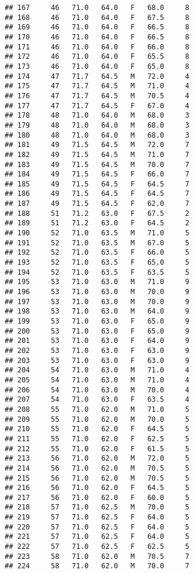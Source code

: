 \documentclass[
]{article}
\begin{document}
\begin{verbatim}
## 167     46   71.0   64.0   F   68.0     8
## 168     46   71.0   64.0   F   67.5     8
## 169     46   71.0   64.0   F   66.5     8
## 170     46   71.0   64.0   F   66.5     8
## 171     46   71.0   64.0   F   66.0     8
## 172     46   71.0   64.0   F   65.5     8
## 173     46   71.0   64.0   F   65.0     8
## 174     47   71.7   64.5   M   72.0     4
## 175     47   71.7   64.5   M   71.0     4
## 176     47   71.7   64.5   M   70.5     4
## 177     47   71.7   64.5   F   67.0     4
## 178     48   71.0   64.0   M   68.0     3
## 179     48   71.0   64.0   M   68.0     3
## 180     48   71.0   64.0   M   68.0     3
## 181     49   71.5   64.5   M   72.0     7
## 182     49   71.5   64.5   M   71.0     7
## 183     49   71.5   64.5   M   70.0     7
## 184     49   71.5   64.5   F   66.0     7
## 185     49   71.5   64.5   F   64.5     7
## 186     49   71.5   64.5   F   64.5     7
## 187     49   71.5   64.5   F   62.0     7
## 188     51   71.2   63.0   F   67.5     2
## 189     51   71.2   63.0   F   64.5     2
## 190     52   71.0   63.5   M   71.0     5
## 191     52   71.0   63.5   M   67.0     5
## 192     52   71.0   63.5   F   66.0     5
## 193     52   71.0   63.5   F   65.0     5
## 194     52   71.0   63.5   F   63.5     5
## 195     53   71.0   63.0   M   71.0     9
## 196     53   71.0   63.0   M   70.0     9
## 197     53   71.0   63.0   M   70.0     9
## 198     53   71.0   63.0   M   64.0     9
## 199     53   71.0   63.0   F   65.0     9
## 200     53   71.0   63.0   F   65.0     9
## 201     53   71.0   63.0   F   64.0     9
## 202     53   71.0   63.0   F   63.0     9
## 203     53   71.0   63.0   F   63.0     9
## 204     54   71.0   63.0   M   71.0     4
## 205     54   71.0   63.0   M   71.0     4
## 206     54   71.0   63.0   M   70.0     4
## 207     54   71.0   63.0   F   63.5     4
## 208     55   71.0   62.0   M   71.0     5
## 209     55   71.0   62.0   M   70.0     5
## 210     55   71.0   62.0   F   64.5     5
## 211     55   71.0   62.0   F   62.5     5
## 212     55   71.0   62.0   F   61.5     5
## 213     56   71.0   62.0   M   72.0     5
## 214     56   71.0   62.0   M   70.5     5
## 215     56   71.0   62.0   M   70.5     5
## 216     56   71.0   62.0   F   64.5     5
## 217     56   71.0   62.0   F   60.0     5
## 218     57   71.0   62.5   M   70.0     5
## 219     57   71.0   62.5   F   64.0     5
## 220     57   71.0   62.5   F   64.0     5
## 221     57   71.0   62.5   F   64.0     5
## 222     57   71.0   62.5   F   62.5     5
## 223     58   71.0   62.0   M   70.5     7
## 224     58   71.0   62.0   M   70.0     7

\end{verbatim}
\end{document}

